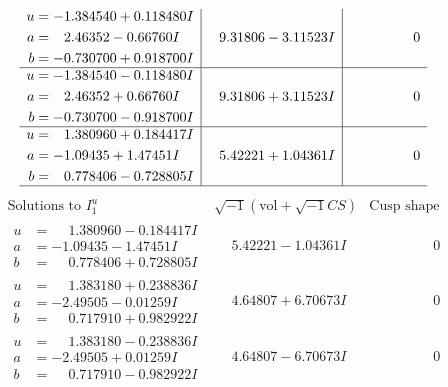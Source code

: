 \documentclass[1p]{elsarticle_modified}
\theoremstyle{definition}
\newcommand{\I}{\sqrt{-1}}
\begin{document}
$$\begin{array}{c|c|c}
\begin{aligned}
u &= -1.384540 + 0.118480 I \\
a &= \phantom{-}2.46352 - 0.66760 I \\
b &= -0.730700 + 0.918700 I\end{aligned}
 & \phantom{-}9.31806 - 3.11523 I & \phantom{-0.000000 } 0 \\ \hline\begin{aligned}
u &= -1.384540 - 0.118480 I \\
a &= \phantom{-}2.46352 + 0.66760 I \\
b &= -0.730700 - 0.918700 I\end{aligned}
 & \phantom{-}9.31806 + 3.11523 I & \phantom{-0.000000 } 0 \\ \hline\begin{aligned}
u &= \phantom{-}1.380960 + 0.184417 I \\
a &= -1.09435 + 1.47451 I \\
b &= \phantom{-}0.778406 - 0.728805 I\end{aligned}
 & \phantom{-}5.42221 + 1.04361 I & \phantom{-0.000000 } 0\\
 \hline 
 \end{array}$$\newpage$$\begin{array}{c|c|c}  
\text{Solutions to }I^u_{1}& \I (\text{vol} + \sqrt{-1}CS) & \text{Cusp shape}\\
 \hline 
\begin{aligned}
u &= \phantom{-}1.380960 - 0.184417 I \\
a &= -1.09435 - 1.47451 I \\
b &= \phantom{-}0.778406 + 0.728805 I\end{aligned}
 & \phantom{-}5.42221 - 1.04361 I & \phantom{-0.000000 } 0 \\ \hline\begin{aligned}
u &= \phantom{-}1.383180 + 0.238836 I \\
a &= -2.49505 - 0.01259 I \\
b &= \phantom{-}0.717910 + 0.982922 I\end{aligned}
 & \phantom{-}4.64807 + 6.70673 I & \phantom{-0.000000 } 0 \\ \hline\begin{aligned}
u &= \phantom{-}1.383180 - 0.238836 I \\
a &= -2.49505 + 0.01259 I \\
b &= \phantom{-}0.717910 - 0.982922 I\end{aligned}
 & \phantom{-}4.64807 - 6.70673 I & \phantom{-0.000000 } 0 \\ \hline\begin{aligned}

\end{aligned}
\end{array}$$
\end{document}
